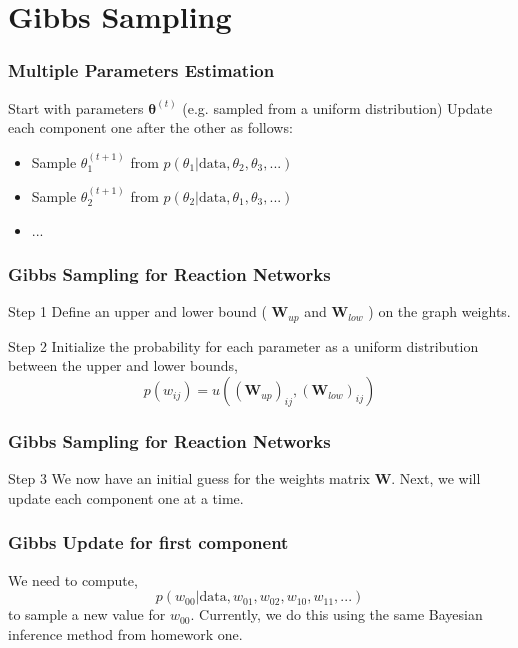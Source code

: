 \documentclass{beamer}
\begin{document}
\section{Gibbs Sampling}

\begin{frame}
\frametitle{Multiple Parameters Estimation}
Start with parameters $\bm{\theta}^{\left( t\right)}$ (e.g. sampled from a uniform distribution)
Update each component one after the other as follows:
\begin{itemize}
\item Sample $\theta^{\left( t + 1 \right)}_{1}$ from $p \left( \theta_{1} | \text{data}, \theta_{2}, \theta_{3}, ... \right)$
\item Sample $\theta^{\left( t+1 \right)}_{2}$ from $p \left( \theta_{2} | \text{data}, \theta_{1}, \theta_{3}, ... \right)$
\item ...
\end{itemize}
\end{frame}

\begin{frame}
\frametitle{Gibbs Sampling for Reaction Networks}

\begin{block}{Step 1}
Define an upper and lower bound ( $\bm{W}_{up}$ and $\bm{W}_{low}$ ) on the graph weights.
\end{block}

\begin{block}{Step 2}
Initialize the probability for each parameter as a uniform distribution between the upper and lower bounds,
\[
p\left(w_{ij}\right)=u\left(\left( \bm{W}_{up} \right)_{ij}, \left( \bm{W}_{low} \right)_{ij} \right)
\]
\end{block}

\end{frame}

\begin{frame}
\frametitle{Gibbs Sampling for Reaction Networks}

\begin{block}{Step 3}
{We now have an initial guess for the weights matrix $\bm{W}$. Next, we will update each component one at a time.}
\end{block}

\end{frame}

\begin{frame}
\frametitle{Gibbs Update for first component}
We need to compute,
\[
p\left(w_{00}|\text{data},w_{01},w_{02},w_{10},w_{11},...\right)
\]
to sample a new value for $w_{00}$. Currently, we do this using the same Bayesian inference method from homework one.
\end{frame}
\end{document}

